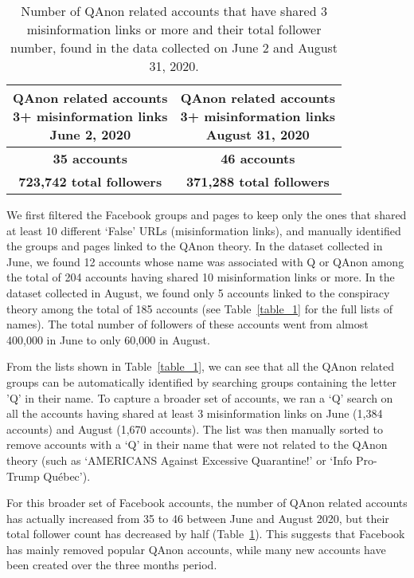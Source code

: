 \documentclass[sigconf]{acmart}
\begin{document}
\begin{table}[h]
  \caption{Number of QAnon related accounts that have shared 3 misinformation links or more and their total follower number, found in the data collected on June 2 and August 31, 2020.}
  \label{table_2}
  \begin{tabular}{cc}
    \toprule
    \shortstack{QAnon related accounts\\ 3+ misinformation links \\ June 2, 2020} & \shortstack{QAnon related accounts\\ 3+ misinformation links \\ August 31, 2020} \\
    \midrule
    \textbf{35 accounts} & \textbf{46 accounts}\\
    \textbf{723,742 total followers} & \textbf{371,288 total followers}\\
  \bottomrule
\end{tabular}
\end{table}

We first filtered the Facebook groups and pages to keep only the ones that shared at least 10 different `False' URLs (misinformation links), and manually identified the groups and pages linked to the QAnon theory. In the dataset collected in June, we found 12 accounts whose name was associated with Q or QAnon among the total of 204 accounts having shared 10 misinformation links or more. In the dataset collected in August, we found only 5 accounts linked to the conspiracy theory among the total of 185 accounts (see Table~\ref{table_1} for the full lists of names). The total number of followers of these accounts went from almost 400,000 in June to only 60,000 in August.

From the lists shown in Table~\ref{table_1}, we can see that all the QAnon related groups can be automatically identified by searching groups containing the letter 'Q' in their name. To capture a broader set of accounts, we ran a `Q' search on all the accounts having shared at least 3 misinformation links on June (1,384 accounts) and August (1,670 accounts). The list was then manually sorted to remove accounts with a `Q' in their name that were not related to the QAnon theory (such as `AMERICANS Against Excessive Quarantine!' or `Info Pro-Trump Qu\'ebec').

For this broader set of Facebook accounts, the number of QAnon related accounts has actually increased from 35 to 46 between June and August 2020, but their total follower count has decreased by half (Table~\ref{table_2}). This suggests that Facebook has mainly removed popular QAnon accounts, while many new accounts have been created over the three months period.
\end{document}
